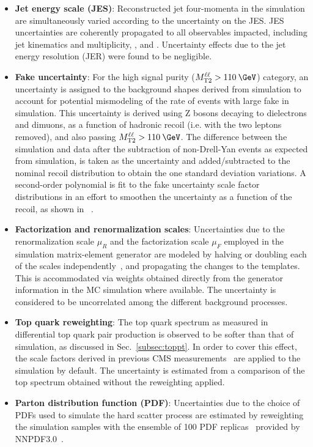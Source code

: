 \begin{itemize}
  \item \textbf{Jet energy scale (JES)}: Reconstructed jet four-momenta in the simulation are simultaneously varied according to the uncertainty on the JES. JES uncertainties are coherently propagated to all observables impacted, including jet kinematics and multiplicity, \ptmiss, and \mttll. Uncertainty effects due to the jet energy resolution (JER) were found to be negligible.
\item \textbf{Fake \ptmiss uncertainty}:
For the high signal purity ($\mttll > 110\:\GeV$) category, an uncertainty is assigned to the background \ptmiss shapes derived from simulation to account for potential mismodeling of the rate of events with large fake \ptmiss in simulation. This uncertainty is derived using Z bosons decaying to dielectrons and dimuons, as a function of hadronic recoil (i.e. \ptmiss with the two leptons removed), and also passing $\mttll > 110\:\GeV$. The difference between the simulation and data after the subtraction of non-Drell-Yan events as expected from simulation, is taken as the uncertainty and added/subtracted to the nominal recoil distribution to obtain the one standard deviation variations. A second-order polynomial is fit to the fake \ptmiss uncertainty scale factor distributions in an effort to smoothen the uncertainty as a function of the recoil, as shown in ~. 
\item \textbf{Factorization and renormalization scales}:
Uncertainties due to the renormalization scale $\mu_R$ and the factorization scale $\mu_F$ employed in the simulation matrix-element generator are modeled by halving or doubling  each of the scales independently~\cite{Collins:1989gx}, and propagating the changes to the \ptmiss templates. This is accommodated via weights obtained directly from the generator information in the MC simulation where available. The uncertainty is considered to be uncorrelated among the different background processes. 
\item \textbf{Top quark \pt reweighting}: 
The top quark \pt spectrum as measured in differential top quark pair production is observed to be softer than that of simulation, as discussed in Sec.~\ref{subsec:toppt}. In order to cover this effect, the scale factors derived in previous CMS measurements~\cite{Khachatryan:2016mnb} are applied to the \ttbar simulation by default. The uncertainty is estimated from a comparison of the top \pt spectrum obtained without the reweighting applied.
\item \textbf{Parton distribution function (PDF)}: Uncertainties due to the choice of PDFs used to simulate the hard scatter process are estimated by reweighting the simulation samples with the ensemble of 100 PDF replicas~\cite{0954-3899-43-2-023001} provided by NNPDF3.0~\cite{Ball:2014uwa}.
\end{itemize}

